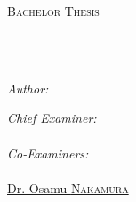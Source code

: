 \documentclass[
11pt, %
english, %
singlespacing, %
headsepline, %
openright, %
]{MastersDoctoralThesis} %
\author{Koh \textsc{You Liang}} %
\numberwithin{figure}{section} %
\numberwithin{equation}{section} %
\begin{document}
\frontmatter %

\pagestyle{plain} %


\begin{titlepage}
\begin{center}

\vspace*{.06\textheight}
{\scshape\LARGE \univname\par}\vspace{1.5cm} %
\textsc{\Large Bachelor Thesis}\\[0.5cm] %

\HRule \\[0.4cm] %
{\huge \bfseries \ttitle\par}\vspace{0.4cm} %
\HRule \\[1.5cm] %
 
\begin{minipage}[t]{0.4\textwidth}
\begin{flushleft} \large
\emph{Author:}\\
\href{https://ylkoh.top}{\authorname} %
\end{flushleft}
\end{minipage}
\begin{minipage}[t]{0.4\textwidth}
\begin{flushright} \large
\emph{Chief Examiner:} \\
\href{https://isc.sfc.wide.ad.jp}{\examname} %
\\
\emph{Co-Examiners:} \\
\href{https://rg.sfc.keio.ac.jp/index.en.html}{\supname} \\
\href{https://rg.sfc.keio.ac.jp/index.en.html}{Dr. Osamu \textsc{Nakamura}}
\end{flushright}
\end{minipage}\\[3cm]
 

\end{center}
\end{titlepage}
\end{document}
